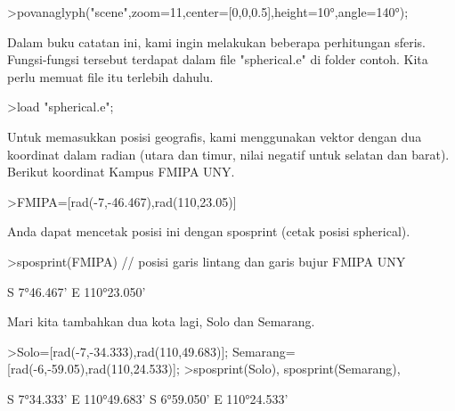 \documentclass[a4paper,10pt]{article}
\begin{document}
\begin{eulernotebook}
\begin{eulercomment}
\begin{eulercomment}
\begin{eulercomment}
\begin{eulercomment}
\begin{eulercomment}
\begin{eulercomment}
\begin{eulercomment}
\begin{eulercomment}
\begin{eulercomment}
\begin{eulercomment}
\begin{eulercomment}
\begin{eulercomment}
\begin{eulercomment}
\begin{eulercomment}
\begin{eulercomment}
\begin{eulercomment}
\begin{eulerprompt}
>povanaglyph("scene",zoom=11,center=[0,0,0.5],height=10°,angle=140°);
\end{eulerprompt}
\begin{eulercomment}
Dalam buku catatan ini, kami ingin melakukan beberapa perhitungan
sferis. Fungsi-fungsi tersebut terdapat dalam file "spherical.e" di
folder contoh. Kita perlu memuat file itu terlebih dahulu.
\end{eulercomment}
\begin{eulerprompt}
>load "spherical.e";
\end{eulerprompt}
\begin{eulercomment}
Untuk memasukkan posisi geografis, kami menggunakan vektor dengan dua
koordinat dalam radian (utara dan timur, nilai negatif untuk selatan
dan barat). Berikut koordinat Kampus FMIPA UNY.
\end{eulercomment}
\begin{eulerprompt}
>FMIPA=[rad(-7,-46.467),rad(110,23.05)]
\end{eulerprompt}
\begin{euleroutput}
  [-0.13569,  1.92657]
\end{euleroutput}
\begin{eulercomment}
Anda dapat mencetak posisi ini dengan sposprint (cetak posisi
spherical).
\end{eulercomment}
\begin{eulerprompt}
>sposprint(FMIPA) // posisi garis lintang dan garis bujur FMIPA UNY
\end{eulerprompt}
\begin{euleroutput}
  S 7°46.467' E 110°23.050'
\end{euleroutput}
\begin{eulercomment}
Mari kita tambahkan dua kota lagi, Solo dan Semarang.
\end{eulercomment}
\begin{eulerprompt}
>Solo=[rad(-7,-34.333),rad(110,49.683)]; Semarang=[rad(-6,-59.05),rad(110,24.533)];
>sposprint(Solo), sposprint(Semarang),
\end{eulerprompt}
\begin{euleroutput}
  S 7°34.333' E 110°49.683'
  S 6°59.050' E 110°24.533'

\end{euleroutput}
\end{eulercomment}
\end{eulercomment}
\end{eulercomment}
\end{eulercomment}
\end{eulercomment}
\end{eulercomment}
\end{eulercomment}
\end{eulercomment}
\end{eulercomment}
\end{eulercomment}
\end{eulercomment}
\end{eulercomment}
\end{eulercomment}
\end{eulercomment}
\end{eulercomment}
\end{eulercomment}
\end{eulernotebook}
\end{document}
